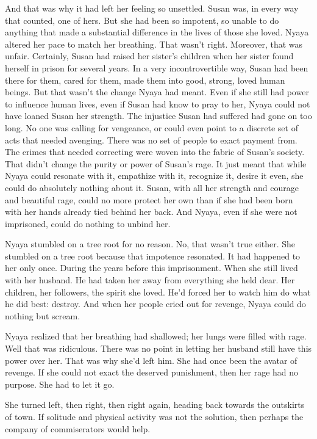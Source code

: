 \documentclass{amsart}
\begin{document}
And that was why it had left her feeling so unsettled. Susan was, in every way that counted, one of hers. But she had been so impotent, so unable to do anything that made a substantial difference in the lives of those she loved. Nyaya altered her pace to match her breathing. That wasn't right. Moreover, that was unfair. Certainly, Susan had raised her sister's children when her sister found herself in prison for several years. In a very incontrovertible way, Susan had been there for them, cared for them, made them into good, strong, loved human beings. But that wasn't the change Nyaya had meant. Even if she still had power to influence human lives, even if Susan had know to pray to her, Nyaya could not have loaned Susan her strength. The injustice Susan had suffered had gone on too long. No one was calling for vengeance, or could even point to a discrete set of acts that needed avenging. There was no set of people to exact payment from. The crimes that needed correcting were woven into the fabric of Susan's society. That didn't change the purity or power of Susan's rage. It just meant that while Nyaya could resonate with it, empathize with it, recognize it, desire it even, she could do absolutely nothing about it. Susan, with all her strength and courage and beautiful rage, could no more protect her own than if she had been born with her hands already tied behind her back. And Nyaya, even if she were not imprisoned, could do nothing to unbind her.

Nyaya stumbled on a tree root for no reason. No, that wasn't true either. She stumbled on a tree root because that impotence resonated. It had happened to her only once. During the years before this imprisonment. When she still lived with her husband. He had taken her away from everything she held dear. Her children, her followers, the spirit she loved. He'd forced her to watch him do what he did best: destroy. And when her people cried out for revenge, Nyaya could do nothing but scream.

Nyaya realized that her breathing had shallowed; her lungs were filled with rage. Well that was ridiculous. There was no point in letting her husband still have this power over her. That was why she'd left him. She had once been the avatar of revenge. If she could not exact the deserved punishment, then her rage had no purpose. She had to let it go.

She turned left, then right, then right again, heading back towards the outskirts of town. If solitude and physical activity was not the solution, then perhaps the company of commiserators would help. 
\end{document}
